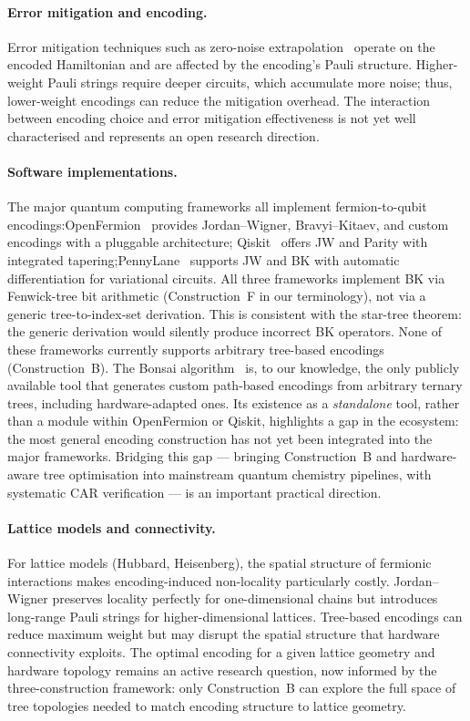 \paragraph{Error mitigation and encoding.}
Error mitigation techniques such as zero-noise
extrapolation~\cite{kandala2019} operate on the encoded Hamiltonian
and are affected by the encoding's Pauli structure.  Higher-weight
Pauli strings require deeper circuits, which accumulate more noise;
thus, lower-weight encodings can reduce the mitigation overhead.
The interaction between encoding choice and error mitigation
effectiveness is not yet well characterised and represents an
open research direction.

\paragraph{Software implementations.}
The major quantum computing frameworks all implement fermion-to-qubit
encodings:\@ OpenFermion~\cite{mcclean2020} provides Jordan--Wigner,
Bravyi--Kitaev, and custom encodings with a pluggable architecture;\@
Qiskit~\cite{qiskit2023} offers JW and Parity with integrated
tapering;\@ PennyLane~\cite{bergholm2022} supports JW and BK with
automatic differentiation for variational circuits.  All three
frameworks implement BK via Fenwick-tree bit arithmetic
(Construction~F in our terminology), not via a generic tree-to-index-set
derivation.  This is consistent with the star-tree theorem: the
generic derivation would silently produce incorrect BK operators.
None of these frameworks currently supports arbitrary tree-based
encodings (Construction~B).  The Bonsai
algorithm~\cite{miller2023bonsai} is, to our knowledge, the only
publicly available tool that generates custom path-based encodings
from arbitrary ternary trees, including hardware-adapted ones.
Its existence as a \emph{standalone} tool, rather than a module
within OpenFermion or Qiskit, highlights a gap in the ecosystem:
the most general encoding construction has not yet been integrated
into the major frameworks.  Bridging this gap --- bringing
Construction~B and hardware-aware tree optimisation into mainstream
quantum chemistry pipelines, with systematic CAR verification --- is
an important practical direction.

\paragraph{Lattice models and connectivity.}
For lattice models (Hubbard, Heisenberg), the spatial structure of
fermionic interactions makes encoding-induced non-locality
particularly costly.  Jordan--Wigner preserves locality perfectly for
one-dimensional chains but introduces long-range Pauli strings for
higher-dimensional lattices.  Tree-based encodings can reduce
maximum weight but may disrupt the spatial structure that
hardware connectivity exploits.  The optimal encoding for a given
lattice geometry and hardware topology remains an active research
question, now informed by the three-construction framework: only
Construction~B can explore the full space of tree topologies needed
to match encoding structure to lattice geometry.

